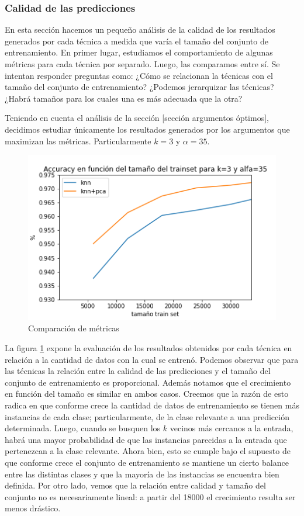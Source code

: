 \subsubsection{Calidad de las predicciones}
En esta sección hacemos un pequeño análisis de la calidad de los resultados generados por cada técnica a medida que varía el tamaño del conjunto de entrenamiento. En primer lugar, estudiamos el comportamiento de algunas métricas para cada técnica por separado. Luego, las comparamos entre sí. Se intentan responder preguntas como: ¿Cómo se relacionan la técnicas con el tamaño del conjunto de entrenamiento? ¿Podemos jerarquizar las técnicas? ¿Habrá tamaños para los cuales una es más adecuada que la otra?
\par
Teniendo en cuenta el análisis de la sección [sección argumentos óptimos], decidimos estudiar únicamente los resultados generados por los argumentos que maximizan las métricas. Particularmente $k=3$ y $\alpha=35$.
\par
\begin{figure}[h]
 \centering
 \includegraphics[width=.7\linewidth]{images/tamanio/metricas_comparacion.png}
 \caption{Comparación de métricas}
 \label{fig:metricas_comp}
\end{figure}
\par 
La figura \ref{fig:metricas_comp} expone la evaluación de los resultados obtenidos por cada técnica en relación a la cantidad de datos con la cual se entrenó. Podemos observar que para las técnicas la relación entre la calidad de las predicciones y el tamaño del conjunto de entrenamiento es proporcional. Además notamos que el crecimiento en función del tamaño es similar en ambos casos. Creemos que la razón de esto radica en que conforme crece la cantidad de datos de entrenamiento se tienen más instancias de cada clase; particularmente, de la clase relevante a una predicción determinada. Luego, cuando se busquen los $k$ vecinos más cercanos a la entrada, habrá una mayor probabilidad de que las instancias parecidas a la entrada que pertenezcan a la clase relevante. Ahora bien, esto se cumple bajo el supuesto de que conforme crece el conjunto de entrenamiento se mantiene un cierto balance entre las distintas clases y que la mayoría de las instancias se encuentra bien definida. Por otro lado, vemos que la relación entre calidad y tamaño del conjunto no es necesariamente lineal: a partir del 18000 el crecimiento resulta ser menos drástico.
